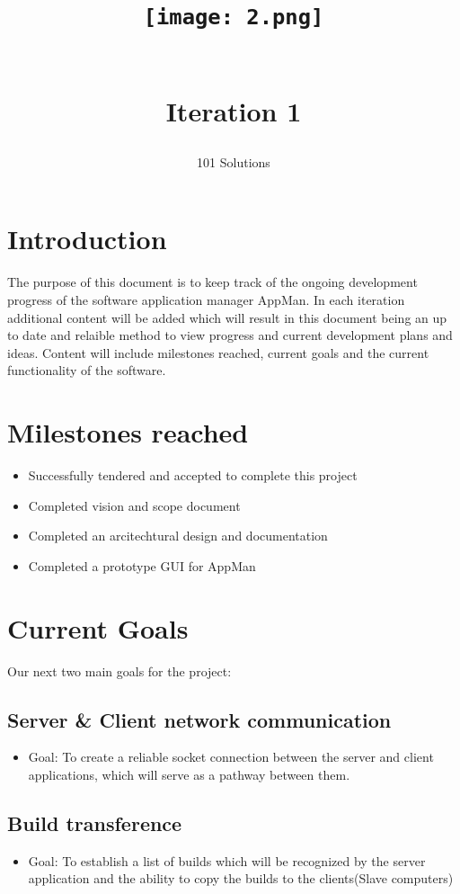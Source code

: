 \documentclass[a4paper,12pt,final]{article}
\title{
\begin{center}
  	\texttt{[image: 2.png]} 
  \end{center}
  \textbf{\\}
Iteration 1\\
}
\author{101 Solutions}
\begin{document}
\maketitle
\thispagestyle{empty}
\newpage
\tableofcontents
\thispagestyle{empty}
\newpage
{}

\section{Introduction}
The purpose of this document is to keep track of the ongoing development progress of the software application manager AppMan.  In each iteration additional content will be added which will result in this document being an up to date and relaible method to view progress and current development plans and ideas. Content will include milestones reached, current goals and the current functionality of the software.

\section{Milestones reached}
\begin{itemize}
\item Successfully tendered and accepted to complete this project
\item Completed vision and scope document
\item Completed an arcitechtural design and documentation
\item Completed a prototype GUI for AppMan
\end{itemize}


\section{Current Goals}
Our next two main goals for the project:
\subsection{Server \& Client network communication}
\begin{itemize}
\item Goal: To create a reliable socket connection between the server and client applications, which will serve as a pathway between them.
\end{itemize}
\subsection{Build transference}
\begin{itemize}
\item Goal: To establish a list of builds which will be recognized by the server application and the ability to copy the builds to the clients(Slave computers)
\end{itemize}
\end{document}
